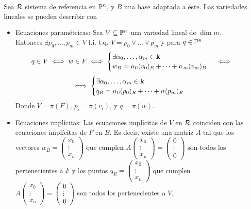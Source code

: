 \begin{obs}
    Sea $\mathcal{R}$ sistema de referencia en $\mathbb{P}^n$, y $B$ una base adaptada a éste. Las variedades lineales se pueden describir con
    \begin{itemize}
        \item Ecuaciones paramétricas: Sea $V \subseteq \mathbb{P}^n$ una variedad lineal de $\dim m$. Entonces
        $\exists p_0, \dots, p_m \in V$ l.i. t.q. $V = p_0 \vee \dots \vee p_m$ y para $q \in \mathbb{P}^n$
        \[
            q \in V \iff w \in F \iff 
            \begin{cases} 
                \exists \alpha_0, \dots, \alpha_m \in \mathbf{k} \\ 
                w_B = \alpha_0(v_0)_B + \dots + \alpha_m(v_m)_B 
            \end{cases} 
            \iff
            \]
        \[
            \iff 
            \begin{cases}
                \exists \alpha_0, \dots, \alpha_m \in \mathbf{k} \\ 
                q_R = \alpha_0 (p_0)_R + \dots + \alpha (p_m)_R 
            \end{cases}
        \]
        Donde $V = \pi(F)$, $p_i = \pi(v_i)$, y $q = \pi(w)$.
        \item Ecuaciones implícitas: Las ecuaciones implícitas de $V$ en $\mathcal{R}$ coinciden con las ecuaciones implícitas de $F$ en
        $B$. Es decir, existe una matriz $A$ tal que los vectores $w_B = \begin{pmatrix} x_0 \\ \vdots \\ x_n \end{pmatrix}$ que cumplen $A \begin{pmatrix} x_0 \\ \vdots \\ x_n \end{pmatrix} = 
        \begin{pmatrix} 0 \\ \vdots \\ 0 \end{pmatrix}$ son todos los pertenecientes a $F$ y los puntos 
        $q_R = \begin{pmatrix} x_0 \\ \vdots \\ x_n \end{pmatrix}$ que cumplen $A \begin{pmatrix} x_0 \\ \vdots \\ x_n \end{pmatrix} = 
        \begin{pmatrix} 0 \\ \vdots \\ 0 \end{pmatrix}$ son todos los pertenecientes a $V$.
    \end{itemize}
\end{obs}
